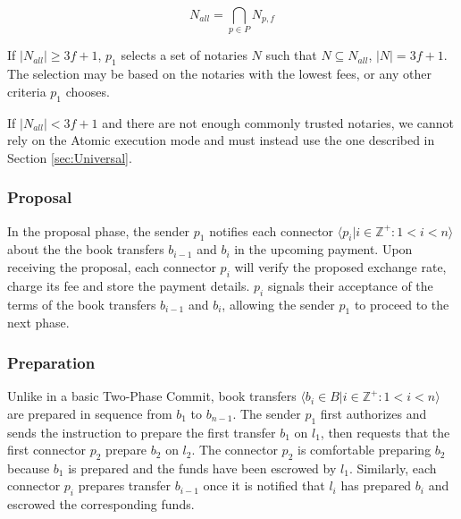 \documentclass[letterpaper,twocolumn,10pt]{article}
\begin{document}
\begin{equation}
N_{all} = \bigcap_{p \in P} N_{p,f}
\end{equation}

If $|N_{all}| \geq 3f+1$, $p_1$ selects a set of notaries $N$ such that $N \subseteq N_{all}$, $|N| = 3f + 1$. The selection may be based on the notaries with the lowest fees, or any other criteria $p_1$ chooses. 

If $|N_{all}| < 3f+1$ and there are not enough commonly trusted notaries, we cannot rely on the Atomic execution mode and must instead use the one described in Section \ref{sec:Universal}.




\subsubsection{Proposal}

In the proposal phase, the sender $p_1$ notifies each connector $ \langle p_i | i \in \mathbb{Z}^+ : 1 < i < n \rangle $ about the the book transfers $b_{i-1}$ and $b_i$ in the upcoming payment. Upon receiving the proposal, each connector $p_i$ will verify the proposed exchange rate, charge its fee and store the payment details. $p_i$ signals their acceptance of the terms of the book transfers $b_{i-1}$ and $b_i$, allowing the sender $p_1$ to proceed to the next phase.

\subsubsection{Preparation}


Unlike in a basic Two-Phase Commit, book transfers 
$ \langle b_i \in B | i \in \mathbb{Z}^+ : 1 < i < n \rangle $
are prepared in sequence from $b_1$ to $b_{n-1}$. The sender $p_1$ first authorizes and sends the instruction to prepare the first transfer $b_1$ on $l_1$, then requests that the first connector $p_2$ prepare $b_2$ on $l_2$. The connector $p_2$ is comfortable preparing $b_2$ because $b_1$ is prepared and the funds have been escrowed by $l_1$. Similarly, each connector $p_i$ prepares transfer $b_{i-1}$ once it is notified that $l_i$ has prepared $b_i$ and escrowed the corresponding funds.
\end{document}
